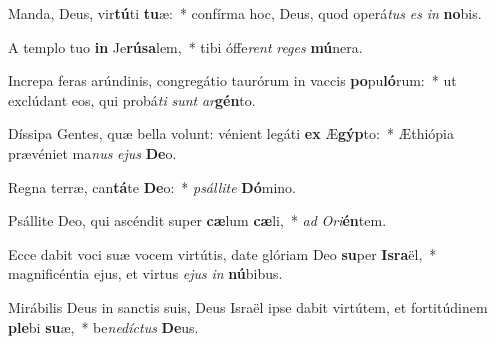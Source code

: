 \item Manda, Deus, vir\textbf{tú}ti \textbf{tu}æ:~* confírma hoc, Deus, quod operá\textit{tus} \textit{es} \textit{in} \textbf{no}bis.
\item A templo tuo \textbf{in} Je\textbf{rú}\textbf{sa}lem,~* tibi óffe\textit{rent} \textit{re}\textit{ges} \textbf{mú}nera.
\item Increpa feras arúndinis, congregátio taurórum in vaccis \textbf{po}pu\textbf{ló}rum:~* ut exclúdant eos, qui probá\textit{ti} \textit{sunt} \textit{ar}\textbf{gén}to.
\item Díssipa Gentes, quæ bella volunt: vénient legáti \textbf{ex} Æ\textbf{gýp}to:~* Æthiópia prævéniet ma\textit{nus} \textit{e}\textit{jus} \textbf{De}o.
\item Regna terræ, can\textbf{tá}te \textbf{De}o:~* \textit{psál}\textit{li}\textit{te} \textbf{Dó}mino.
\item Psállite Deo, qui ascéndit super \textbf{cæ}lum \textbf{cæ}li,~* \textit{ad} \textit{O}\textit{ri}\textbf{én}tem.
\item Ecce dabit voci suæ vocem virtútis, date glóriam Deo \textbf{su}per \textbf{Is}\textbf{ra}ël,~* magnificéntia ejus, et virtus \textit{e}\textit{jus} \textit{in} \textbf{nú}bibus.
\item Mirábilis Deus in sanctis suis, Deus Israël ipse dabit virtútem, et fortitúdinem \textbf{ple}bi \textbf{su}æ,~* be\textit{ne}\textit{díc}\textit{tus} \textbf{De}us.
